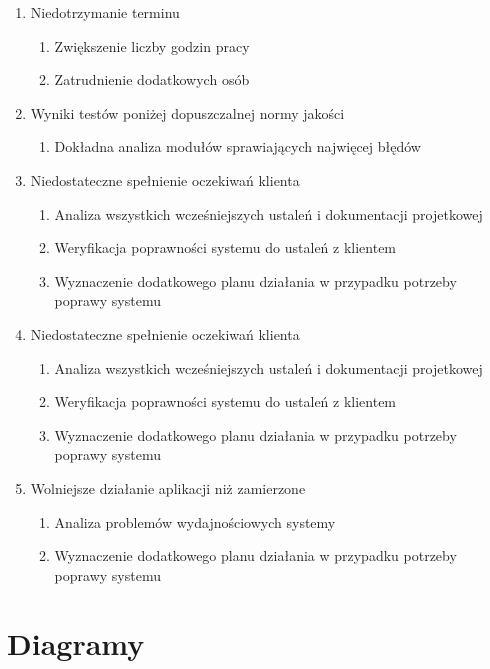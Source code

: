 \documentclass[12pt,a4paper]{article}
\begin{document}
\begin{enumerate}
    \item Niedotrzymanie terminu
        \begin{enumerate}
            \item Zwiększenie liczby godzin pracy
            \item Zatrudnienie dodatkowych osób
        \end{enumerate}
    \item Wyniki testów poniżej dopuszczalnej normy jakości
        \begin{enumerate}
            \item Dokładna analiza modułów sprawiających najwięcej błędów
        \end{enumerate}
    \item Niedostateczne spełnienie oczekiwań klienta
        \begin{enumerate}
            \item Analiza wszystkich wcześniejszych ustaleń i dokumentacji projetkowej
            \item Weryfikacja poprawności systemu do ustaleń z klientem
            \item Wyznaczenie dodatkowego planu działania w przypadku potrzeby poprawy systemu
        \end{enumerate}
    \item Niedostateczne spełnienie oczekiwań klienta
        \begin{enumerate}
            \item Analiza wszystkich wcześniejszych ustaleń i dokumentacji projetkowej
            \item Weryfikacja poprawności systemu do ustaleń z klientem
            \item Wyznaczenie dodatkowego planu działania w przypadku potrzeby poprawy systemu
        \end{enumerate}
    \item Wolniejsze działanie aplikacji niż zamierzone
        \begin{enumerate}
            \item Analiza problemów wydajnościowych systemy
            \item Wyznaczenie dodatkowego planu działania w przypadku potrzeby poprawy systemu
        \end{enumerate}
\end{enumerate}

\section{Diagramy}
\end{document}
